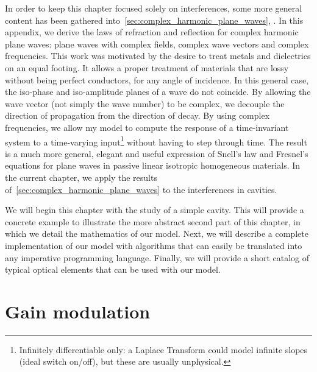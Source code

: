 In order to keep this chapter focused solely on interferences, some more general content has been gathered into~\cref{sec:complex_harmonic_plane_waves}, .
In this appendix, we derive the laws of refraction and reflection for complex harmonic plane waves: plane waves with complex fields, complex wave vectors and complex frequencies.
This work was motivated by the desire to treat metals and dielectrics on an equal footing.
It allows a proper treatment of materials that are lossy without being perfect conductors, for any angle of incidence.
In this general case, the iso-phase and iso-amplitude planes of a wave do not coincide.
By allowing the wave vector (not simply the wave number) to be complex, we decouple the direction of propagation from the direction of decay.
By using complex frequencies, we allow my model to compute the response of a time-invariant system to a time-varying input\footnote{
Infinitely differentiable only: a Laplace Transform could model infinite slopes (ideal switch on/off), but these are usually unphysical.
} without having to step through time.
The result is a much more general, elegant and useful expression of Snell's law and Fresnel's equations for plane waves in passive linear isotropic homogeneous materials.
In the current chapter, we apply the results of~\cref{sec:complex_harmonic_plane_waves} to the interferences in cavities.

We will begin this chapter with the study of a simple cavity.
This will provide a concrete example to illustrate the more abstract second part of this chapter, in which we detail the mathematics of our model.
Next, we will describe a complete implementation of our model with algorithms that can easily be translated into any imperative programming language.
Finally, we will provide a short catalog of typical optical elements that can be used with our model.





\FloatBarrier


\section{Gain modulation}
\label{sec:from_cavity_to_ripple}
\label{sec:fabry_perot_example}

